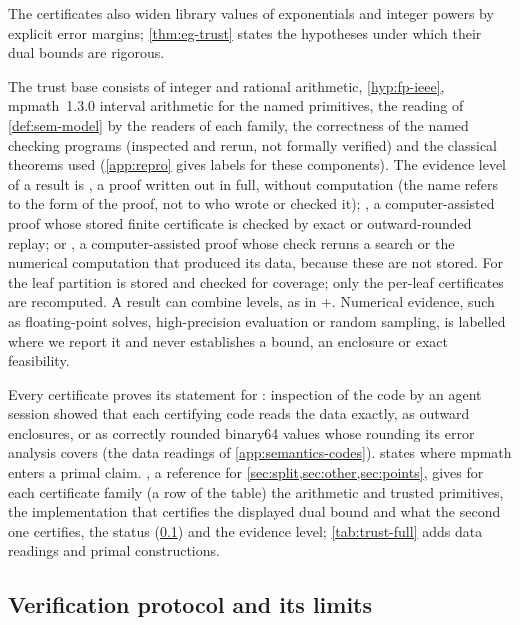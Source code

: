The  certificates also widen library values of exponentials and integer powers by explicit error margins; \cref{thm:eg-trust} states the hypotheses under which their dual bounds are rigorous.

The trust base consists of integer and rational arithmetic, \cref{hyp:fp-ieee}, mpmath~1.3.0 interval arithmetic for the named primitives, the reading of \cref{def:sem-model} by the readers of each family, the correctness of the named checking programs (inspected and rerun, not formally verified) and the classical theorems used (\cref{app:repro} gives labels for these components).
The evidence level of a result is , a proof written out in full, without computation (the name refers to the form of the proof, not to who wrote or checked it); , a computer-assisted proof whose stored finite certificate is checked by exact or outward-rounded replay; or , a computer-assisted proof whose check reruns a search or the numerical computation that produced its data, because these are not stored.
For  the leaf partition is stored and checked for coverage; only the per-leaf certificates are recomputed.
A result can combine levels, as in +.
Numerical evidence, such as floating-point solves, high-precision evaluation or random sampling, is labelled where we report it and never establishes a bound, an enclosure or exact feasibility.

Every certificate proves its statement for : inspection of the code by an agent session showed that each certifying code reads the data exactly, as outward enclosures, or as correctly rounded binary64 values whose rounding its error analysis covers (the data readings of \cref{app:semantics-codes}).
 states where mpmath enters a primal claim.
, a reference for \cref{sec:split,sec:other,sec:points}, gives for each certificate family (a row of the table) the arithmetic and trusted primitives, the implementation that certifies the displayed dual bound and what the second one certifies, the status (\cref{sec:semantics-protocol}) and the evidence level; \cref{tab:trust-full} adds data readings and primal constructions.



\subsection{Verification protocol and its limits}\label{sec:semantics-protocol}

